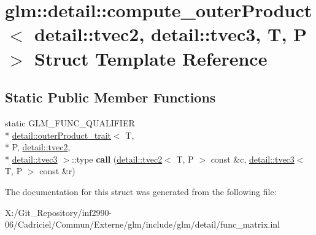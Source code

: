 \hypertarget{structglm_1_1detail_1_1compute__outer_product_3_01detail_1_1tvec2_00_01detail_1_1tvec3_00_01_t_00_01_p_01_4}{\section{glm\-:\-:detail\-:\-:compute\-\_\-outer\-Product$<$ detail\-:\-:tvec2, detail\-:\-:tvec3, T, P $>$ Struct Template Reference}
\label{structglm_1_1detail_1_1compute__outer_product_3_01detail_1_1tvec2_00_01detail_1_1tvec3_00_01_t_00_01_p_01_4}
}
\subsection*{Static Public Member Functions}
\begin{DoxyCompactItemize}
\item 
\hypertarget{structglm_1_1detail_1_1compute__outer_product_3_01detail_1_1tvec2_00_01detail_1_1tvec3_00_01_t_00_01_p_01_4_af6f9ddad4215d4169d2cd021bd1769f4}{static G\-L\-M\-\_\-\-F\-U\-N\-C\-\_\-\-Q\-U\-A\-L\-I\-F\-I\-E\-R \\*
\hyperlink{structglm_1_1detail_1_1outer_product__trait}{detail\-::outer\-Product\-\_\-trait}$<$ T, \\*
P, \hyperlink{structglm_1_1detail_1_1tvec2}{detail\-::tvec2}, \\*
\hyperlink{structglm_1_1detail_1_1tvec3}{detail\-::tvec3} $>$\-::type {\bfseries call} (\hyperlink{structglm_1_1detail_1_1tvec2}{detail\-::tvec2}$<$ T, P $>$ const \&c, \hyperlink{structglm_1_1detail_1_1tvec3}{detail\-::tvec3}$<$ T, P $>$ const \&r)}\label{structglm_1_1detail_1_1compute__outer_product_3_01detail_1_1tvec2_00_01detail_1_1tvec3_00_01_t_00_01_p_01_4_af6f9ddad4215d4169d2cd021bd1769f4}

\end{DoxyCompactItemize}


The documentation for this struct was generated from the following file\-:\begin{DoxyCompactItemize}
\item 
X\-:/\-Git\-\_\-\-Repository/inf2990-\/06/\-Cadriciel/\-Commun/\-Externe/glm/include/glm/detail/func\-\_\-matrix.\-inl\end{DoxyCompactItemize}

